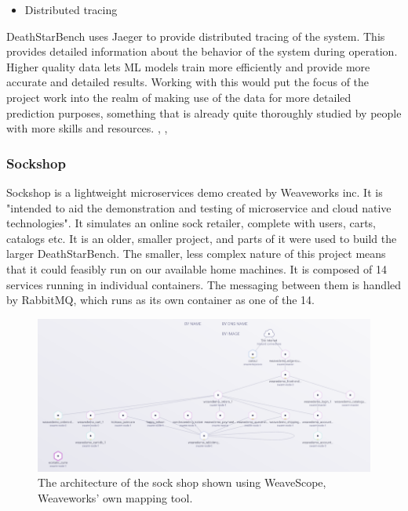 \begin{itemize}
    \item Distributed tracing
\end{itemize}
DeathStarBench uses Jaeger to provide distributed tracing of the system. This provides detailed information about the behavior of the system during operation. Higher quality data lets ML models train more efficiently and provide more accurate and detailed results. 
Working with this would put the focus of the project work into the realm of making use of the data for more detailed prediction purposes, something that is already quite thoroughly studied by people with more skills and resources. \cite*{Bogatinovski}, \cite*{Nedelkoski2019}, \cite*{Zhou2021a}



\subsubsection{Sockshop}
Sockshop is a lightweight microservices demo created by Weaveworks inc. It is "intended to aid the demonstration and testing of microservice and cloud native technologies". \cite*{Weaveworks} It simulates an online sock retailer, complete with users, carts, catalogs etc. 
It is an older, smaller project, and parts of it were used to build the larger DeathStarBench. \cite*{Gan2019}
The smaller, less complex nature of this project means that it could feasibly run on our available home machines. 
It is composed of 14 services running in individual containers. The messaging between them is handled by RabbitMQ, which runs as its own container as one of the 14. 

\begin{figure}[ht] 
\centering 
\includegraphics[width=\columnwidth]{Figures/Charts/sockshop-scope_trimmed.png}
\caption{The architecture of the sock shop shown using WeaveScope, Weaveworks' own mapping tool.}
\label{Sockshop architecture}
\end{figure}

